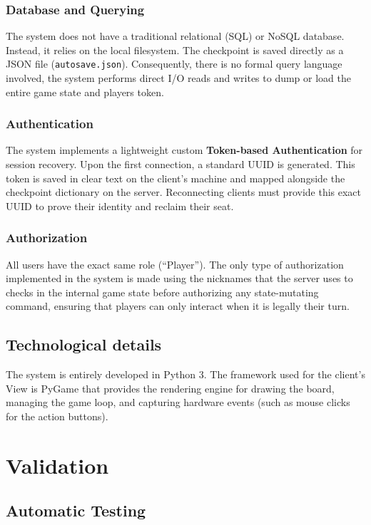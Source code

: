 \documentclass{scrartcl}
\begin{document}
\subsubsection*{Database and Querying}
The system does not have a traditional relational (SQL) or NoSQL database.
Instead, it relies on the local filesystem.
The checkpoint is saved directly as a JSON file (\texttt{autosave.json}).
Consequently, there is no formal query language involved,
the system performs direct I/O reads and writes to dump or load the entire game state and players token.

\subsubsection*{Authentication}
The system implements a lightweight custom \textbf{Token-based Authentication} for session recovery.
Upon the first connection, a standard UUID is generated.
This token is saved in clear text on the client's machine and mapped alongside the checkpoint dictionary on the server.
Reconnecting clients must provide this exact UUID to prove their identity and reclaim their seat.

\subsubsection*{Authorization}
All users have the exact same role (``Player'').
The only type of authorization implemented in the system is made using the nicknames that
the server uses to checks in the internal game state before authorizing any state-mutating command,
ensuring that players can only interact when it is legally their turn.

\subsection{Technological details}\label{technological-details}

The system is entirely developed in Python 3.
The framework used for the client's View is PyGame that provides the rendering engine for drawing the board, managing the game loop,
and capturing hardware events (such as mouse clicks for the action buttons).


\section{Validation}\label{validation}

\subsection{Automatic Testing}\label{automatic-testing}
\end{document}
